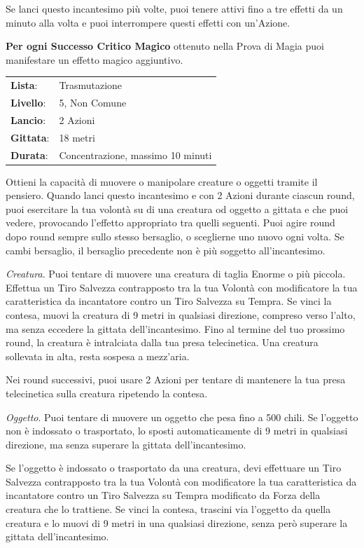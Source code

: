 \begin{multicols}{2}
Se lanci questo incantesimo più volte, puoi tenere attivi fino a tre effetti da un minuto alla volta e puoi interrompere questi effetti con un'Azione.

\textbf{Per ogni Successo Critico Magico} ottenuto nella Prova di Magia puoi manifestare un effetto magico aggiuntivo.

\noindent\begin{tabularx}{\linewidth}{p{1.3cm}X}
	\rowcolor{gray!20}\textbf{Lista}: & Trasmutazione \\
	\textbf{Livello}: & 5, Non Comune \\
	\rowcolor{gray!20}\textbf{Lancio}: & 2 Azioni \\
	\textbf{Gittata}: & 18 metri \\
	\rowcolor{gray!20}\textbf{Durata}: & Concentrazione, massimo 10 minuti \\
\end{tabularx}\smallskip

Ottieni la capacità di muovere o manipolare creature o oggetti tramite il pensiero. Quando lanci questo incantesimo e con 2 Azioni durante ciascun round, puoi esercitare la tua volontà su di una creatura od oggetto a gittata e che puoi vedere, provocando l'effetto appropriato tra quelli seguenti. Puoi agire round dopo round sempre sullo stesso bersaglio, o sceglierne uno nuovo ogni volta. Se cambi bersaglio, il bersaglio precedente non è più soggetto all'incantesimo.

\emph{Creatura}. Puoi tentare di muovere una creatura di taglia Enorme o più piccola. Effettua un Tiro Salvezza contrapposto tra la tua Volontà con modificatore la tua caratteristica da incantatore contro un Tiro Salvezza su Tempra. Se vinci la contesa, muovi la creatura di 9 metri in qualsiasi direzione, compreso verso l'alto, ma senza eccedere la gittata dell'incantesimo. Fino al termine del tuo prossimo round, la creatura è intralciata dalla tua presa telecinetica. Una creatura sollevata in alta, resta sospesa a mezz'aria.

Nei round successivi, puoi usare 2 Azioni per tentare di mantenere la tua presa telecinetica sulla creatura ripetendo la contesa.

\emph{Oggetto}. Puoi tentare di muovere un oggetto che pesa fino a 500 chili. Se l'oggetto non è indossato o trasportato, lo sposti automaticamente di 9 metri in qualsiasi direzione, ma senza superare la gittata dell'incantesimo.

Se l'oggetto è indossato o trasportato da una creatura, devi effettuare un Tiro Salvezza contrapposto tra la tua Volontà con modificatore la tua caratteristica da incantatore contro un Tiro Salvezza su Tempra modificato da Forza della creatura che lo trattiene. Se vinci la contesa, trascini via l'oggetto da quella creatura e lo muovi di 9 metri in una qualsiasi direzione, senza però superare la gittata dell'incantesimo.


\end{multicols}
